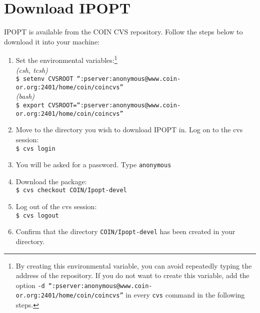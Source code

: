 \documentclass[letter,12pt]{article}
\begin{document}
\section{Download IPOPT}
IPOPT is available from the COIN CVS repository. Follow the steps below to
download it into your machine:
\begin{enumerate}
\item{Set the environmental variables:\footnote{By creating this environmental variable, you can avoid repeatedly typing
 the address of the repository. If you do not want to create this variable, add
 the option
 {\tt -d
``:pserver:anonymous@www.coin-or.org:2401/home/coin/coincvs''} in
every {\tt cvs} command in the following steps.}\\
\textit{(csh, tcsh)}\\
{\tt \$ setenv CVSROOT 
``:pserver:anonymous@www.coin-or.org:2401/home/coin/coincvs''}\\
\textit{(bash)}\\
{\tt \$ export
CVSROOT=``:pserver:anonymous@www.coin-or.org:2401/home/coin/coincvs''}}
\item{Move to the directory you wish to download IPOPT in. Log on to the cvs session:\\
{\tt \$ cvs login}}
\item{You will be asked for a password. Type {\tt anonymous}}
\item{Download the package:\\
{\tt\$ cvs checkout COIN/Ipopt-devel}}
\item{Log out of the cvs session:\\
{\tt \$ cvs logout}}
\item{Confirm that the directory {\tt COIN/Ipopt-devel} has been created in
your directory.}
\end{enumerate}
\end{document}

